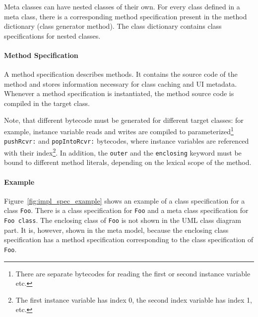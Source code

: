 Meta classes can have nested classes of their own. For every class defined in a meta class, there is a corresponding method specification present in the method dictionary (class generator method). The class dictionary contains class specifications for nested classes.

\paragraph{Method Specification}
A method specification describes methods. It contains the source code of the method and stores information necessary for class caching and UI metadata. Whenever a method specification is instantiated, the method source code is compiled in the target class. 

Note, that different bytecode must be generated for different target classes: for example, instance variable reads and writes are compiled to parameterized\footnote{There are separate bytecodes for reading the first or second instance variable etc.} \texttt{pushRcvr:} and \texttt{popIntoRcvr:} bytecodes, where instance variables are referenced with their index\footnote{The first instance variable has index 0, the second index variable has index 1, etc.}. In addition, the \texttt{outer} and the \texttt{enclosing} keyword must be bound to different method literals, depending on the lexical scope of the method.

\paragraph{Example}
Figure~\ref{fig:impl_spec_example} shows an example of a class specification for a class \texttt{Foo}. There is a class specification for \texttt{Foo} and a meta class specification for \texttt{Foo class}. The enclosing class of \texttt{Foo} is not shown in the UML class diagram part. It is, however, shown in the meta model, because the enclosing class specification has a method specification corresponding to the class specification of \texttt{Foo}.

